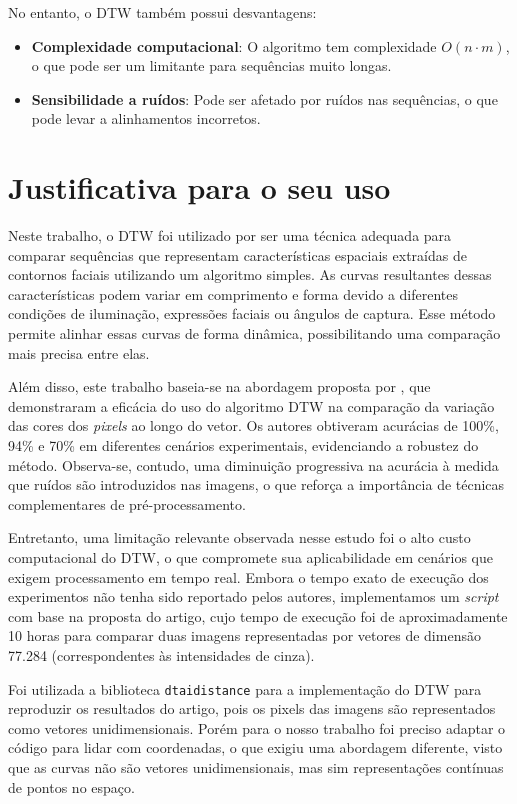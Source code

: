 No entanto, o DTW também possui desvantagens:
\begin{itemize}
    \item \textbf{Complexidade computacional}: O algoritmo tem complexidade \(O(n \cdot m)\), o que pode ser um limitante para sequências muito longas.
    \item \textbf{Sensibilidade a ruídos}: Pode ser afetado por ruídos nas sequências, o que pode levar a alinhamentos incorretos.
\end{itemize}


\section{Justificativa para o seu uso}

Neste trabalho, o DTW foi utilizado por ser uma técnica adequada para comparar sequências que representam características espaciais extraídas de contornos faciais utilizando um algoritmo simples. As curvas resultantes dessas características podem variar em comprimento e forma devido a diferentes condições de iluminação, expressões faciais ou ângulos de captura. Esse método permite alinhar essas curvas de forma dinâmica, possibilitando uma comparação mais precisa entre elas.

Além disso, este trabalho baseia-se na abordagem proposta por \citet{DTW_LSTM}, que demonstraram a eficácia do uso do algoritmo DTW na comparação da variação das cores dos \textit{pixels} ao longo do vetor. Os autores obtiveram acurácias de 100\%, 94\% e 70\% em diferentes cenários experimentais, evidenciando a robustez do método. Observa-se, contudo, uma diminuição progressiva na acurácia à medida que ruídos são introduzidos nas imagens, o que reforça a importância de técnicas complementares de pré-processamento.


Entretanto, uma limitação relevante observada nesse estudo foi o alto custo computacional do DTW, o que compromete sua aplicabilidade em cenários que exigem processamento em tempo real. Embora o tempo exato de execução dos experimentos não tenha sido reportado pelos autores, implementamos um \textit{script} com base na proposta do artigo, cujo tempo de execução foi de aproximadamente 10 horas para comparar duas imagens representadas por vetores de dimensão 77.284 (correspondentes às intensidades de cinza). 

Foi utilizada a biblioteca \texttt{dtaidistance}  \cite{libDTW} para a implementação do DTW para reproduzir os resultados do artigo, pois os pixels das imagens são representados como vetores unidimensionais. Porém para o nosso trabalho foi preciso adaptar o código para lidar com coordenadas, o que exigiu uma abordagem diferente, visto que as curvas não são vetores unidimensionais, mas sim representações contínuas de pontos no espaço.

